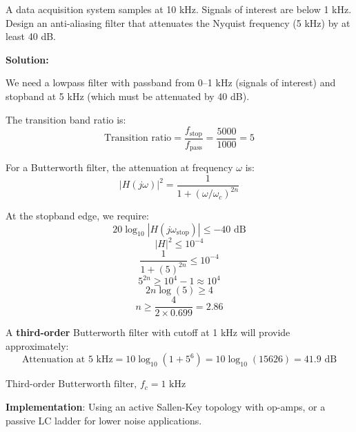 \begin{example}
\label{ex:antialiasing_filter}
A data acquisition system samples at 10 kHz. Signals of interest are below 1 kHz. Design an anti-aliasing filter that attenuates the Nyquist frequency (5 kHz) by at least 40 dB.

\textbf{Solution:}

We need a lowpass filter with passband from 0--1 kHz (signals of interest) and stopband at 5 kHz (which must be attenuated by 40 dB).

The transition band ratio is:
\begin{equation*}
\text{Transition ratio} = \frac{f_{\text{stop}}}{f_{\text{pass}}} = \frac{5000}{1000} = 5
\end{equation*}

For a Butterworth filter, the attenuation at frequency $\omega$ is:
\begin{equation*}
|H(j\omega)|^2 = \frac{1}{1 + (\omega/\omega_c)^{2n}}
\end{equation*}

At the stopband edge, we require:
\begin{equation*}
20 \log_{10}|H(j\omega_{\text{stop}})| \leq -40 \text{ dB}
\end{equation*}
\begin{equation*}
|H|^2 \leq 10^{-4}
\end{equation*}
\begin{equation*}
\frac{1}{1 + (5)^{2n}} \leq 10^{-4}
\end{equation*}
\begin{equation*}
5^{2n} \geq 10^4 - 1 \approx 10^4
\end{equation*}
\begin{equation*}
2n \log(5) \geq 4
\end{equation*}
\begin{equation*}
n \geq \frac{4}{2 \times 0.699} = 2.86
\end{equation*}

A \textbf{third-order} Butterworth filter with cutoff at 1 kHz will provide approximately:
\begin{equation*}
\text{Attenuation at 5 kHz} = 10 \log_{10}(1 + 5^6) = 10 \log_{10}(15626) = 41.9 \text{ dB}
\end{equation*}

$\boxed{\text{Third-order Butterworth filter, } f_c = 1 \text{ kHz}}$

\textbf{Implementation}: Using an active Sallen-Key topology with op-amps, or a passive LC ladder for lower noise applications.
\end{example}

